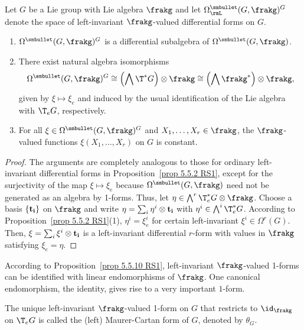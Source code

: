 \begin{prop}[{{\cite[Prop.~5.5.10]{RS1}}}]\label{prop 5.5.10 RS1}
    Let $G$ be a Lie group with Lie algebra $\frakg$ and let $\Omega^{\smbullet }_\rmL(G,\frakg)^G$ denote the space of left-invariant $\frakg$-valued differential forms on $G$.
    \begin{enumerate}
        \item $\Omega^{\smbullet }(G,\frakg)^G$ is a differential subalgebra of $\Omega^{\smbullet }(G,\frakg)$.
        \item There exist natural algebra isomorphisms
        \[\Omega^{\smbullet }(G,\frakg)^G\cong \left(\bigwedge \T^\ast G\right)\otimes\frakg\cong \left(\bigwedge\frakg^\ast\right)\otimes\frakg,\]
        given by $\xi\mapsto \xi_e$ and induced by the usual identification of the Lie algebra with $\T_eG$, respectively.
        \item For all $\xi\in\Omega^{\smbullet }(G,\frakg)^G$ and $X_1,\ldots,X_r\in\frakg$, the $\frakg$-valued functions $\xi(X_1,\ldots,X_r)$ on $G$ is constant.
    \end{enumerate}
\end{prop}
\begin{proof}
    The arguments are completely analogous to those for ordinary left-invariant differential forms in Proposition~\ref{prop 5.5.2 RS1}, except for the surjectivity of the map $\xi\mapsto \xi_e$ because $\Omega^{\smbullet }(G,\frakg)$ need not be generated as an algebra by 1-forms. Thus, let $\eta\in\bigwedge\nolimits^r \T^\ast_eG\otimes \frakg$. Choose a basis $\{\bf{t}_i\}$ on $\frakg$ and write $\eta=\sum_i\eta^i\otimes \bf{t}_i$ with $\eta^i\in\bigwedge\nolimits^i\T^\ast_eG$. According to Proposition~\ref{prop 5.5.2 RS1}(1), $\eta^i=\xi^i_e$ for certain left-invariant $\xi^i\in\Omega^r(G)$. Then, $\xi=\sum_i\xi^i\otimes \bf{t}_i$ is a left-invariant differential $r$-form with values in $\frakg$ satisfying $\xi_e=\eta$.
\end{proof}

According to Proposition~\ref{prop 5.5.10 RS1}, left-invariant $\frakg$-valued 1-forms can be identified with linear endomorphisms of $\frakg$. One canonical endomorphism, the identity, gives rise to a very important $1$-form.

\begin{defn}
    The unique left-invariant $\frakg$-valued 1-form on $G$ that restricts to $\id_\frakg$ on $\T_e G$ is called the (left) Maurer-Cartan form of $G$, denoted by $\theta_G$.
\end{defn}

